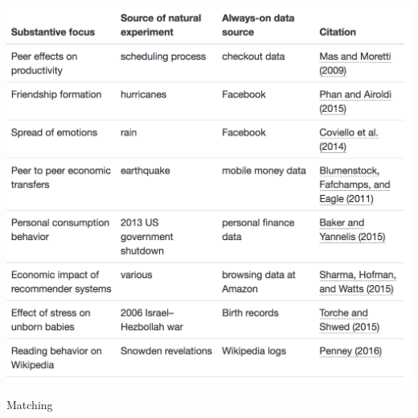 \documentclass[aspectratio=169]{beamer}
\begin{document}
\begin{frame}

\begin{center}
\includegraphics[height=0.8\textheight]{figures/natural_experiments_table.png}
\end{center}

\end{frame}
\begin{frame}

Matching

\end{frame}
\end{document}
